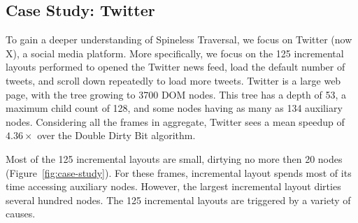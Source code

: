 \subsection{Case Study: Twitter}
To gain a deeper understanding of Spineless Traversal,
  we focus on Twitter (now X), a social media platform.
More specifically,
  we focus on the 125 incremental layouts performed
  to opened the Twitter news feed,
  load the default number of tweets,
  and scroll down repeatedly to load more tweets.
Twitter is a large web page,
  with the tree growing to 3700 DOM nodes.
This tree has a depth of 53,
  a maximum child count of 128,
  and some nodes having as many as 134 auxiliary nodes. 
Considering all the frames in aggregate,
  Twitter sees a mean speedup of $4.36\times$ 
  over the Double Dirty Bit algorithm.

Most of the 125 incremental layouts are small,
  dirtying no more then 20 nodes (Figure~\ref{fig:case-study}).
For these frames,
  incremental layout spends most of its time
  accessing auxiliary nodes.
However, the largest incremental layout
  dirties several hundred nodes.
The 125 incremental layouts are triggered
  by a variety of causes.

